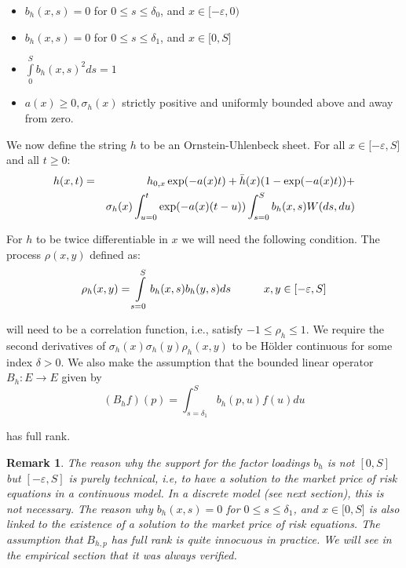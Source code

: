 \documentclass{article}
\newtheorem{remark}{Remark}
\begin{document}
\begin{itemize}
\item $b_{h}(x,s)=0$ for $0\leq s\leq \delta _{0}$, and $x\in \lbrack
-\varepsilon ,0)$

\item $b_{h}(x,s)=0$ for $0\leq s\leq \delta _{1}$, and $x\in \lbrack 0,S]$

\item $\int\limits_{0}^{S}b_{h}(x,s)^{2}ds=1$

\item $a(x)\geq 0,\sigma _{h}(x)$ strictly positive and uniformly bounded
above and away from zero.
\end{itemize}

We now define the string $h$ to be an Ornstein-Uhlenbeck sheet. For all $%
x\in \lbrack -\varepsilon ,S]$ and all $t\geq 0$:%
\begin{eqnarray} \label{equ_h_A}
h(x,t) &=&h_{0,x}\exp (-a(x)t)+\bar{h}(x)(1-\exp (-a(x)t))+
\\
&&\sigma _{h}(x)\int_{u=0}^{t}\exp
(-a(x)(t-u))\int_{s=0}^{S}b_{h}(x,s)W(ds,du)  \notag
\end{eqnarray}

For $h$ to be twice differentiable in $x$ we will need the following
condition. The process $\rho (x,y)$ defined as:%
\begin{equation}
\rho _{h}(x,y)=\int\limits_{s=0}^{S}b_{h}(x,s)b_{h}(y,s)ds\text{ \ \ \ \ \ \
}x,y\in \lbrack -\varepsilon ,S]  \label{rho_h}
\end{equation}%
\bigskip

will need to be a correlation function, i.e., satisfy $-1\leq \rho _{h}\leq 1
$. We require the second derivatives of $\sigma _{h}(x)\sigma _{h}(y)\rho
_{h}(x,y)$ to be H\"{o}lder continuous for some index $\delta >0$. We also
make the assumption that the bounded linear operator $B_{h}:E\rightarrow E$
given by%
\begin{equation*}
(B_{h}f)(p)=\int_{s=\delta _{1}}^{S}b_{h}(p,u)f(u)du
\end{equation*}%
\bigskip

has full rank.

\bigskip


\begin{remark}
The reason why the support for the factor loadings $b_{h}$ is not $[0,S]$
but $[-\varepsilon ,S]$ is purely technical, i.e, to have a solution to the
market price of risk equations in a continuous model. In a discrete model
(see next section), this is not necessary. The reason why $b_{h}(x,s)=0$ for
$0\leq s\leq \delta _{1}$, and $x\in \lbrack 0,S]$ is also linked to the
existence of a solution to the market price of risk equations.
The assumption that $B_{h,p}$ has full rank
is quite innocuous in practice. We will see in the empirical section that it
was always verified.\bigskip
\end{remark}
\end{document}
